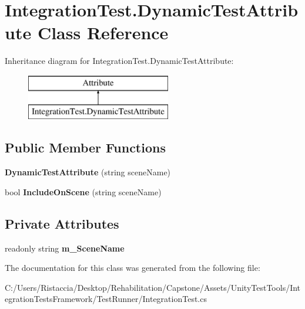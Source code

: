 \hypertarget{class_integration_test_1_1_dynamic_test_attribute}{}\section{Integration\+Test.\+Dynamic\+Test\+Attribute Class Reference}
\label{class_integration_test_1_1_dynamic_test_attribute}
Inheritance diagram for Integration\+Test.\+Dynamic\+Test\+Attribute\+:\begin{figure}[H]
\begin{center}
\leavevmode
\includegraphics[height=2.000000cm]{class_integration_test_1_1_dynamic_test_attribute}
\end{center}
\end{figure}
\subsection*{Public Member Functions}
\begin{DoxyCompactItemize}
\item 
\mbox{\label{class_integration_test_1_1_dynamic_test_attribute_a8aed7029bcbcdc471b56ed1cc86c5226}} 
{\bfseries Dynamic\+Test\+Attribute} (string scene\+Name)
\item 
\mbox{\label{class_integration_test_1_1_dynamic_test_attribute_a6ecee57524bd79fdcb9be60e21f9996d}} 
bool {\bfseries Include\+On\+Scene} (string scene\+Name)
\end{DoxyCompactItemize}
\subsection*{Private Attributes}
\begin{DoxyCompactItemize}
\item 
\mbox{\label{class_integration_test_1_1_dynamic_test_attribute_aa5c132f8bfadfbc102a494c431ec39ec}} 
readonly string {\bfseries m\+\_\+\+Scene\+Name}
\end{DoxyCompactItemize}


The documentation for this class was generated from the following file\+:\begin{DoxyCompactItemize}
\item 
C\+:/\+Users/\+Ristaccia/\+Desktop/\+Rehabilitation/\+Capstone/\+Assets/\+Unity\+Test\+Tools/\+Integration\+Tests\+Framework/\+Test\+Runner/Integration\+Test.\+cs\end{DoxyCompactItemize}
